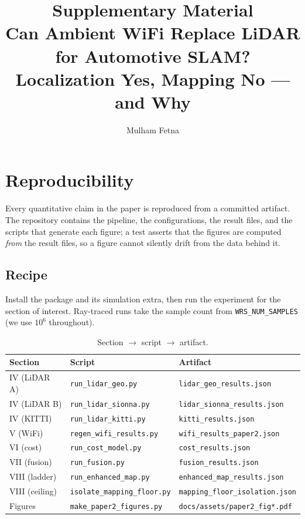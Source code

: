 \documentclass[journal]{IEEEtran}
\begin{document}
\title{Supplementary Material\\
\large Can Ambient WiFi Replace LiDAR for Automotive SLAM?\\
Localization Yes, Mapping No --- and Why}
\author{Mulham Fetna}
\maketitle

\section{Reproducibility}

Every quantitative claim in the paper is reproduced from a committed artifact. The
repository contains the pipeline, the configurations, the result files, and the scripts that
generate each figure; a test asserts that the figures are computed \emph{from} the result
files, so a figure cannot silently drift from the data behind it.

\subsection{Recipe}
Install the package and its simulation extra, then run the experiment for the section of
interest. Ray-traced runs take the sample count from \texttt{WRS\_NUM\_SAMPLES}
(we use $10^6$ throughout).

\begin{table}[h]
\caption{Section $\rightarrow$ script $\rightarrow$ artifact.}
\centering
\footnotesize
\begin{tabular}{lll}
\toprule
Section & Script & Artifact \\
\midrule
IV (LiDAR A)   & \texttt{run\_lidar\_geo.py}     & \texttt{lidar\_geo\_results.json} \\
IV (LiDAR B)   & \texttt{run\_lidar\_sionna.py}  & \texttt{lidar\_sionna\_results.json} \\
IV (KITTI)     & \texttt{run\_lidar\_kitti.py}   & \texttt{kitti\_results.json} \\
V  (WiFi)      & \texttt{regen\_wifi\_results.py}& \texttt{wifi\_results\_paper2.json} \\
VI (cost)      & \texttt{run\_cost\_model.py}    & \texttt{cost\_results.json} \\
VII (fusion)   & \texttt{run\_fusion.py}         & \texttt{fusion\_results.json} \\
VIII (ladder)  & \texttt{run\_enhanced\_map.py}  & \texttt{enhanced\_map\_results.json} \\
VIII (ceiling) & \texttt{isolate\_mapping\_floor.py} & \texttt{mapping\_floor\_isolation.json} \\
Figures        & \texttt{make\_paper2\_figures.py}   & \texttt{docs/assets/paper2\_fig*.pdf} \\
\bottomrule
\end{tabular}
\end{table}
\end{document}
